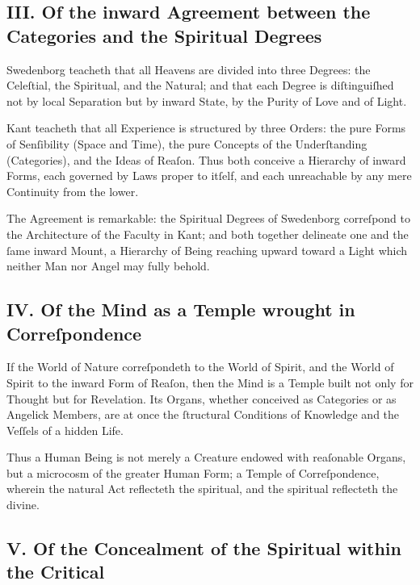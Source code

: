 \documentclass[12pt]{article}
\begin{document}
\subsection*{III. Of the inward Agreement between the Categories and the Spiritual Degrees}

Swedenborg teacheth that all Heavens are divided into three Degrees: the 
Celeſtial, the Spiritual, and the Natural; and that each Degree is diſtinguiſhed 
not by local Separation but by inward State, by the Purity of Love and of 
Light.

Kant teacheth that all Experience is structured by three Orders: the pure 
Forms of Senſibility (Space and Time), the pure Concepts of the 
Underſtanding (Categories), and the Ideas of Reaſon. Thus both conceive a 
Hierarchy of inward Forms, each governed by Laws proper to itſelf, and each 
unreachable by any mere Continuity from the lower.

The Agreement is remarkable: the Spiritual Degrees of Swedenborg correſpond to 
the Architecture of the Faculty in Kant; and both together delineate one and 
the ſame inward Mount, a Hierarchy of Being reaching upward toward a Light 
which neither Man nor Angel may fully behold.

\subsection*{IV. Of the Mind as a Temple wrought in Correſpondence}

If the World of Nature correſpondeth to the World of Spirit, and the World of 
Spirit to the inward Form of Reaſon, then the Mind is a Temple built not only 
for Thought but for Revelation. Its Organs, whether conceived as Categories or 
as Angelick Members, are at once the ſtructural Conditions of Knowledge and the 
Veſſels of a hidden Life.

Thus a Human Being is not merely a Creature endowed with reaſonable Organs, 
but a microcosm of the greater Human Form; a Temple of Correſpondence, wherein 
the natural Act reflecteth the spiritual, and the spiritual reflecteth the 
divine.

\subsection*{V. Of the Concealment of the Spiritual within the Critical}
\end{document}
